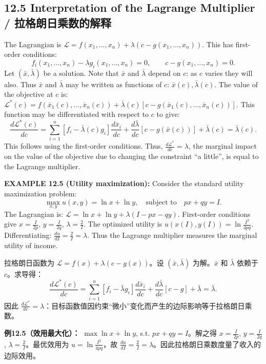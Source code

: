 \subsection{12.5 Interpretation of the Lagrange Multiplier / 拉格朗日乘数的解释}

\begin{original}
The Lagrangian is $\mathcal{L} = f(x_1,\ldots,x_n) + \lambda(c - g(x_1,\ldots,x_n))$. This has first-order conditions:
\[
f_i(x_1,\ldots,x_n) - \lambda g_i(x_1,\ldots,x_n) = 0, \qquad c - g(x_1,\ldots,x_n) = 0.
\]
Let $(\bar{x},\bar{\lambda})$ be a solution. Note that $\bar{x}$ and $\bar{\lambda}$ depend on $c$: as $c$ varies they will also. Thus $\bar{x}$ and $\bar{\lambda}$ may be written as functions of $c$: $\bar{x}(c), \bar{\lambda}(c)$. The value of the objective at $c$ is: $\mathcal{L}^*(c) = f(\bar{x}_1(c),\ldots,\bar{x}_n(c)) + \bar{\lambda}(c)[c - g(\bar{x}_1(c),\ldots,\bar{x}_n(c))]$. This function may be differentiated with respect to $c$ to give:
\[
\frac{d\mathcal{L}^*(c)}{dc} = \sum_{i=1}^n [f_i - \bar{\lambda}(c)g_i]\frac{d\bar{x}_i}{dc} + \frac{d\bar{\lambda}}{dc}[c - g(\bar{x}(c))] + \bar{\lambda}(c) = \bar{\lambda}(c).
\]
This follows using the first-order conditions. Thus, $\frac{d\mathcal{L}^*}{dc} = \lambda$, the marginal impact on the value of the objective due to changing the constraint ``a little'', is equal to the Lagrange multiplier.

\textbf{EXAMPLE 12.5 (Utility maximization):} Consider the standard utility maximization problem:
\[
\max_{x,y} u(x,y) = \ln x + \ln y, \quad\text{subject to}\quad px + qy = I.
\]
The Lagrangian is: $\mathcal{L} = \ln x + \ln y + \lambda(I - px - qy)$. First-order conditions give $x = \frac{I}{2p}$, $y = \frac{I}{2q}$, $\lambda = \frac{2}{I}$. The optimized utility is $u(x(I), y(I)) = \ln\frac{I^2}{4pq}$. Differentiating: $\frac{du}{dI} = \frac{2}{I} = \lambda$. Thus the Lagrange multiplier measures the marginal utility of income.
\end{original}
\begin{translation}
拉格朗日函数为 $\mathcal{L} = f(x) + \lambda(c - g(x))$。设 $(\bar{x}, \bar{\lambda})$ 为解。$\bar{x}$ 和 $\bar{\lambda}$ 依赖于 $c$。求导得：
\[
\frac{d\mathcal{L}^*(c)}{dc} = \sum_{i=1}^n [f_i - \bar{\lambda} g_i]\frac{d\bar{x}_i}{dc} + \frac{d\bar{\lambda}}{dc}[c - g] + \bar{\lambda} = \bar{\lambda}.
\]
因此 $\frac{d\mathcal{L}^*}{dc} = \lambda$：目标函数值因约束``微小''变化而产生的边际影响等于拉格朗日乘数。

\textbf{例12.5（效用最大化）：} $\max \ln x + \ln y$, s.t. $px + qy = I$。解之得 $x = \frac{I}{2p}$, $y = \frac{I}{2q}$, $\lambda = \frac{2}{I}$。最优效用为 $u = \ln\frac{I^2}{4pq}$，故 $\frac{du}{dI} = \frac{2}{I} = \lambda$。因此拉格朗日乘数度量了收入的边际效用。
\end{translation}


